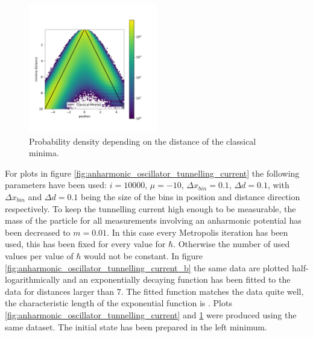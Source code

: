 \documentclass{scrartcl}
\begin{document}
		\begin{figure}[H]
			\centering
			\includegraphics[width=0.5\textwidth]{../imgs/anharmonic_oscillator_lambda_parameter/track_100001000_lambda_parameter.pdf}
			\caption{Probability density depending on the distance of the classical minima.}
			\label{fig:anharmonic_oscillator_lambda_parameter}
		\end{figure}
		For plots in figure \ref{fig:anharmonic_oscillator_tunnelling_current} the following parameters have been used: $i=10000$, $\mu = -10$, $\Delta x_{bin} = 0.1$, $\Delta d = 0.1$, with $\Delta x_{bin}$ and $\Delta d = 0.1$ being the size of the bins in position and distance direction respectively.
		To keep the tunnelling current high enough to be measurable, the mass of the particle for all measurements involving an anharmonic potential has been decreased to $m=0.01$.
		In this case every  Metropolis iteration has been used, this has been fixed for every value for $\hbar$.
		Otherwise the number of used values per value of $\hbar$ would not be constant.
		In figure \ref{fig:anharmonic_oscillator_tunnelling_current_b} the same data are plotted half-logarithmically and an exponentially decaying function has been fitted to the data for distances larger than 7.
		The fitted function matches the data quite well, the characteristic length of the exponential function is \unskip.
		Plots \ref{fig:anharmonic_oscillator_tunnelling_current} and \ref{fig:anharmonic_oscillator_lambda_parameter} were produced using the same dataset.
		The initial state has been prepared in the left minimum.
\end{document}
